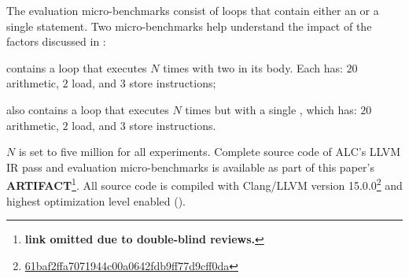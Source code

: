The evaluation micro-benchmarks consist of loops that contain either an  or  a single  statement.
Two micro-benchmarks help understand the impact of the factors discussed in :
\begin{inparaenum}
    \item \textbf{\ifElseBench} contains a loop that executes $N$ times with two \cpaths in its body. Each \cpath has: $20$ arithmetic, $2$ load, and $3$ store instructions;
    \item \textbf{\ifThenBench} also contains a loop that executes $N$ times but with a single \cpath, which has: $20$ arithmetic, $2$ load, and $3$ store instructions.
\end{inparaenum}
$N$ is set to five million for all experiments.
Complete source code of ALC's LLVM IR pass and evaluation micro-benchmarks is available as part of this paper's \textbf{ARTIFACT}\footnote{\textbf{link omitted due to double-blind reviews.}}.
All source code is compiled with Clang/LLVM version 15.0.0\footnote{\href{https://github.com/llvm/llvm-project/commit/61baf2ffa7071944c00a0642fdb9ff77d9cff0da}{61baf2ffa7071944c00a0642fdb9ff77d9cff0da}} and highest optimization level enabled ().


